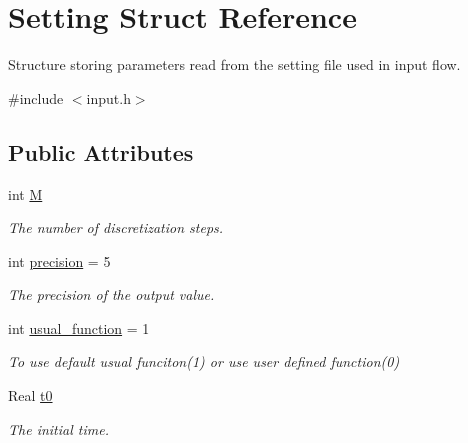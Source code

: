 \hypertarget{struct_setting}{}\section{Setting Struct Reference}
\label{struct_setting}


Structure storing parameters read from the setting file used in input flow.  




{\ttfamily \#include $<$input.\+h$>$}

\subsection*{Public Attributes}
\begin{DoxyCompactItemize}
\item 
\mbox{\label{struct_setting_a7d0cd8484c787085547a178a311239bd}} 
int \mbox{\hyperlink{struct_setting_a7d0cd8484c787085547a178a311239bd}{M}}
\begin{DoxyCompactList}\small\item\em The number of discretization steps. \end{DoxyCompactList}\item 
\mbox{\label{struct_setting_ab12392850916088ffc92d7eeccf84950}} 
int \mbox{\hyperlink{struct_setting_ab12392850916088ffc92d7eeccf84950}{precision}} = 5
\begin{DoxyCompactList}\small\item\em The precision of the output value. \end{DoxyCompactList}\item 
\mbox{\label{struct_setting_aa4971ccaf90929605fc4f326e9f0b08a}} 
int \mbox{\hyperlink{struct_setting_aa4971ccaf90929605fc4f326e9f0b08a}{usual\+\_\+function}} = 1
\begin{DoxyCompactList}\small\item\em To use default usual funciton(1) or use user defined function(0) \end{DoxyCompactList}\item 
\mbox{\label{struct_setting_a60b5d988c449e64b535813eeff85a55b}} 
Real \mbox{\hyperlink{struct_setting_a60b5d988c449e64b535813eeff85a55b}{t0}}
\begin{DoxyCompactList}\small\item\em The initial time. \end{DoxyCompactList}\item 

\end{DoxyCompactItemize}
